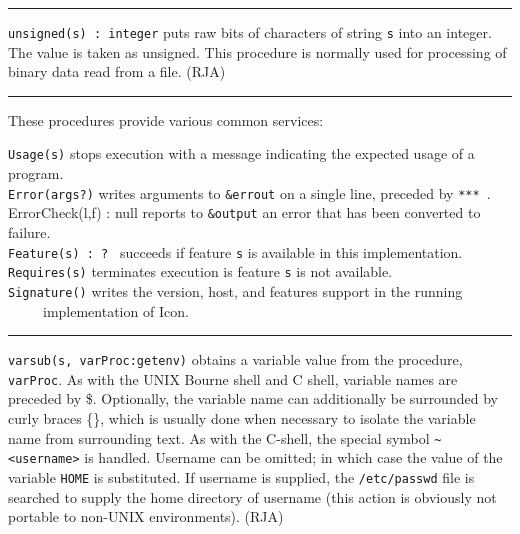 \vspace{0.25cm}\hrule{}

\texttt{unsigned(s) : integer} puts raw bits of characters of string
\texttt{s} into an integer. The value is taken as unsigned. This
procedure is normally used for processing of binary data read from a
file. (RJA)

\vspace{0.25cm}\hrule{}

These procedures provide various common services: 

\texttt{Usage(s)} stops execution with a message
indicating the expected usage of a program.\\
\texttt{Error(args?)} writes arguments to \texttt{\&errout} on a single
line, preceded by \texttt{{\textquotedbl}*** {\textquotedbl}}.\\
\textsf{ErrorCheck(l,f) : null} reports to \texttt{\&output} an error
that has been converted to failure.\\
\texttt{Feature(s)}\texttt{ : ?} \ succeeds if feature
\texttt{s} is available in this implementation.\\
\texttt{Requires(s)} terminates execution is feature \texttt{s} is not
available.\\
\texttt{Signature()} writes the version, host, and features support in
the running\\
 \ \ \ \ \ implementation of Icon. 

\vspace{0.25cm}\hrule{}

\texttt{varsub(s, varProc:getenv)} obtains a variable value from the
procedure, \texttt{varProc}. As with the UNIX Bourne shell and C shell,
variable names are preceded by \$. Optionally, the variable name can
additionally be surrounded by curly braces \{\}, which is usually done
when necessary to isolate the variable name from surrounding text. As
with the C-shell, the special symbol
\texttt{\~{}{\textless}username{\textgreater}} is handled. Username can
be omitted; in which case the value of the variable \texttt{HOME} is
substituted. If username is supplied, the \texttt{/etc/passwd} file is
searched to supply the home directory of username (this action is
obviously not portable to non-UNIX environments). (RJA)

